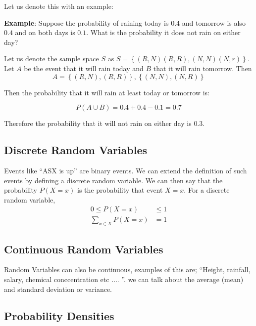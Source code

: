 Let us denote this with an example:

\begin{cBox}
	\textbf{Example}: Suppose the probability of raining today is $0.4$ and tomorrow is also $0.4$ and on both days is $0.1$. What is the probability it does not rain on either day? 


	Let us denote the sample space $S$ as $S = \left\{ (R,N) (R,R), (N,N) (N,r) \right\}$. Let $A$ be the event that it will rain today and $B$ that it will rain tomorrow. Then 
	\begin{equation}
	A = \left\{ (R,N), (R,R) \right\}, \left\{ (N,N), (N,R) \right\}
	\end{equation}
\end{cBox}

Then the probability that it will rain at least today or tomorrow is:

\begin{equation}
	P(A\cup B) = 0.4 + 0.4 -0.1 =0.7
\end{equation}

Therefore the probability that it will not rain on either day is $0.3$. 

\subsection{Discrete Random Variables}

Events like ``ASX is up'' are binary events. We can extend the definition of such events by defining a discrete random variable.  We can then say that the probability $P(X=x)$ is the probability that event $X=x$. For a discrete random variable, 
\begin{align*}
	0  \leq P(X=x) & \leq 1\\
	\sum_{x \in X} P(X=x) & = 1
\end{align*}

\subsection{Continuous Random Variables}

Random Variables can also be continuous, examples of this are; ``Height, rainfall, salary, chemical conccentration etc $\dots$. ''. we can talk about the average (mean) and standard deviation or variance. 

\subsection{Probability Densities}

